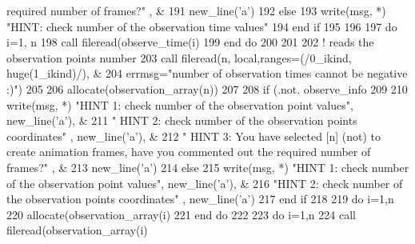 \begin{DoxyCode}
{       required number of frames?"}\textcolor{comment}{ , & }
191 \textcolor{comment}{          new\_line(}\textcolor{stringliteral}{'a'})
192       \textcolor{keywordflow}{else}
193         \textcolor{keyword}{write}(msg, *) \textcolor{stringliteral}{"HINT: check number of the observation time values"}
194 \textcolor{keywordflow}{      end if}
195       
196       
197       \textcolor{keywordflow}{do} i=1, n
198         \textcolor{keyword}{call }fileread(observe_time(i)%
199 \textcolor{keywordflow}{      end do}
200       
201 
202       \textcolor{comment}{! reads the observation points number}
203       \textcolor{keyword}{call }fileread(n, local,ranges=(/0\_ikind, huge(1\_ikind)/), &
204         errmsg=\textcolor{stringliteral}{"number of observation times cannot be negative :)"})
205       
206       \textcolor{keyword}{allocate}(observation_array(n))   
207       
208        \textcolor{keywordflow}{if} (.not. observe_info%
209         
210          \textcolor{keyword}{write}(msg, *) \textcolor{stringliteral}{"HINT 1: check number of the observation point values"}, new\_line\textcolor{comment}{(}\textcolor{stringliteral}{'a'}\textcolor{comment}{), &}
211 \textcolor{comment}{             }\textcolor{stringliteral}{"  HINT 2: check number of the observation points coordinates"} , new\_line\textcolor{comment}{(}\textcolor{stringliteral}{'a'}\textcolor{comment}{), &}
212 \textcolor{comment}{             }\textcolor{stringliteral}{"  HINT 3: You have selected [n] (not) to create animation frames, have you commented out the
       required number of frames?"}\textcolor{comment}{ , &}
213 \textcolor{comment}{                new\_line(}\textcolor{stringliteral}{'a'})
214       \textcolor{keywordflow}{else}
215         \textcolor{keyword}{write}(msg, *)  \textcolor{stringliteral}{"HINT 1: check number of the observation point values"}, new\_line\textcolor{comment}{(}\textcolor{stringliteral}{'a'}\textcolor{comment}{), &}
216 \textcolor{comment}{         }\textcolor{stringliteral}{"HINT 2: check number of the observation points coordinates"} , new\_line\textcolor{comment}{(}\textcolor{stringliteral}{'a'}\textcolor{comment}{)}
217 \textcolor{comment}{}\textcolor{keywordflow}{      end if}     
218       
219       \textcolor{keywordflow}{do} i=1,n
220         \textcolor{keyword}{allocate}(observation_array(i)%
221 \textcolor{keywordflow}{      end do}
222       
223       \textcolor{keywordflow}{do} i=1,n
224         \textcolor{keyword}{call }fileread(observation_array(i)%

\end{DoxyCode}
